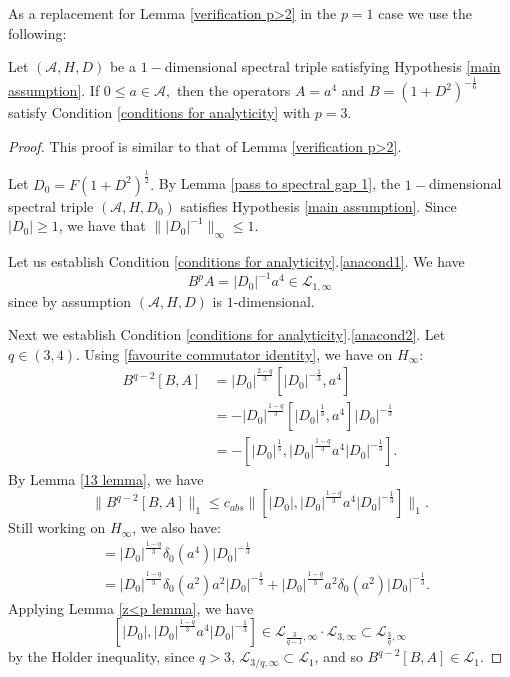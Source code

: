     As a replacement for Lemma \ref{verification p>2} in the $p=1$ case we use the following:
    \begin{lem}\label{verification p=1} 
        Let $(\mathcal{A},H,D)$ be a $1-$dimensional spectral triple satisfying Hypothesis \ref{main assumption}. 
        If $0\leq a \in\mathcal{A},$ then the operators $A=a^4$ and $B=(1+D^2)^{-\frac16}$ satisfy Condition \ref{conditions for analyticity} with $p=3.$
    \end{lem}
    \begin{proof} 
        This proof is similar to that of Lemma \ref{verification p>2}.
    
        Let $D_0=F(1+D^2)^{\frac12}.$ By Lemma \ref{pass to spectral gap 1}, the $1-$dimensional spectral triple $(\mathcal{A},H,D_0)$ satisfies Hypothesis \ref{main assumption}. Since $|D_0| \geq 1$,
        we have that $\||D_0|^{-1}\|_\infty \leq 1$.

        Let us establish Condition \ref{conditions for analyticity}.\eqref{anacond1}. We have
        $$B^pA=|D_0|^{-1}a^4\in\mathcal{L}_{1,\infty}$$
        since by assumption $(\mathcal{A},H,D)$ is $1$-dimensional.

        Next we establish Condition \ref{conditions for analyticity}.\eqref{anacond2}. Let $q\in(3,4).$ Using \eqref{favourite commutator identity}, we have on $H_\infty$:
        \begin{align*}
            B^{q-2}[B,A] &= |D_0|^{\frac{2-q}{3}}[|D_0|^{-\frac13},a^4]\\
                         &= -|D_0|^{\frac{1-q}{3}}[|D_0|^{\frac13},a^4]|D_0|^{-\frac13}\\
                         &= -[|D_0|^{\frac13},|D_0|^{\frac{1-q}3}a^4|D_0|^{-\frac13}].
        \end{align*}
        By Lemma \ref{13 lemma}, we have
        $$\|B^{q-2}[B,A]\|_1\leq c_{abs}\|[|D_0|,|D_0|^{\frac{1-q}3}a^4|D_0|^{-\frac13}]\|_1.$$
        Still working on $H_\infty$, we also have:
        \begin{align*}
            [|D_0|,|D_0|^{\frac{1-q}3}a^4|D_0|^{-\frac13}] &= |D_0|^{\frac{1-q}3}\delta_0(a^4)|D_0|^{-\frac13}\\
                                                           &= |D_0|^{\frac{1-q}3}\delta_0(a^2)a^2|D_0|^{-\frac13}+|D_0|^{\frac{1-q}3}a^2\delta_0(a^2)|D_0|^{-\frac13}.
        \end{align*}
        Applying Lemma \ref{z<p lemma}, we have
        $$[|D_0|,|D_0|^{\frac{1-q}3}a^4|D_0|^{-\frac13}]\in\mathcal{L}_{\frac{3}{q-1},\infty}\cdot\mathcal{L}_{3,\infty}\subset\mathcal{L}_{\frac{3}{q},\infty}$$
        by the Holder inequality, since $q > 3$, $\mathcal{L}_{3/q,\infty} \subset \mathcal{L}_1$, and so $B^{q-2}[B,A] \in \mathcal{L}_1$.


\end{proof}
